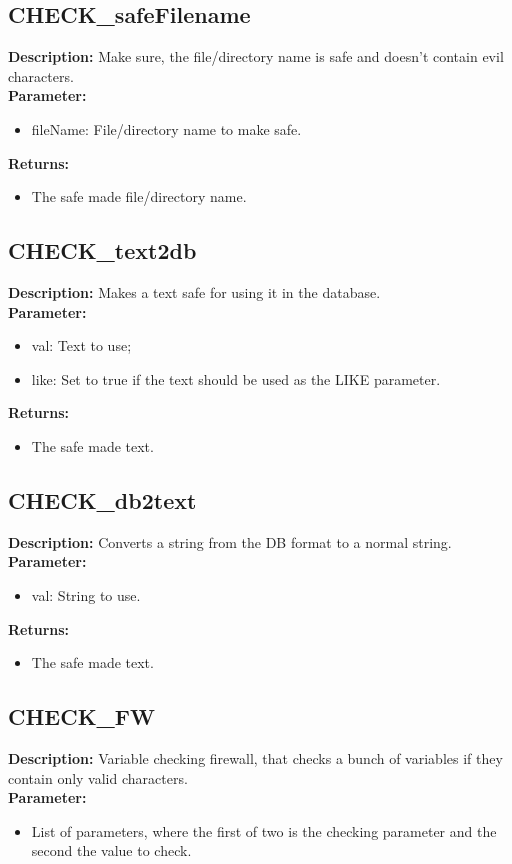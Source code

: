 \subsection{CHECK\_safeFilename}
\textbf{Description:} Make sure, the file/directory name is safe and doesn't contain evil characters.\\
\textbf{Parameter:}
\begin{itemize}
\item fileName: File/directory name to make safe.
\end{itemize}
\textbf{Returns:}
\begin{itemize}
\item The safe made file/directory name.
\end{itemize}

\subsection{CHECK\_text2db}
\textbf{Description:} Makes a text safe for using it in the database.\\
\textbf{Parameter:}
\begin{itemize}
\item val: Text to use;
\item like: Set to true if the text should be used as the LIKE parameter.
\end{itemize}
\textbf{Returns:}
\begin{itemize}
\item The safe made text.
\end{itemize}

\subsection{CHECK\_db2text}
\textbf{Description:} Converts a string from the DB format to a normal string.\\
\textbf{Parameter:}
\begin{itemize}
\item val: String to use.
\end{itemize}
\textbf{Returns:}
\begin{itemize}
\item The safe made text.
\end{itemize}

\subsection{CHECK\_FW}
\textbf{Description:} Variable checking firewall, that checks a bunch of variables if they contain only valid characters.\\
\textbf{Parameter:}
\begin{itemize}
\item List of parameters, where the first of two is the checking parameter and the second the value to check.
\end{itemize}

